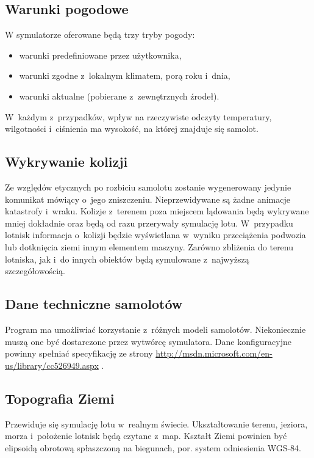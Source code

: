 \documentclass{mwrep}
\begin{document}
\subsection{Warunki pogodowe}
W symulatorze oferowane będą trzy tryby pogody:

\begin{itemize}
\item warunki predefiniowane przez użytkownika,
\item warunki zgodne z~lokalnym klimatem, porą roku i~dnia,
\item warunki aktualne (pobierane z~zewnętrznych źrodeł).
\end{itemize}

W~każdym z~przypadków, wpływ na rzeczywiste odczyty temperatury, wilgotności i~ciśnienia ma wysokość, na której znajduje się samolot.


\subsection{Wykrywanie kolizji}
Ze względów etycznych po rozbiciu samolotu zostanie wygenerowany jedynie komunikat mówiący o~jego zniszczeniu. Nieprzewidywane są żadne animacje katastrofy i~wraku. Kolizje z~terenem poza miejscem lądowania będą wykrywane mniej dokładnie oraz będą od razu przerywały symulację lotu. W~przypadku lotnisk informacja o~kolizji będzie wyświetlana w~wyniku przeciążenia podwozia lub dotknięcia ziemi innym elementem maszyny. Zarówno zbliżenia do terenu lotniska, jak i~do innych obiektów będą symulowane z~najwyższą szczegółowością.

\subsection{Dane techniczne samolotów}
Program ma umożliwiać korzystanie z~różnych modeli samolotów. Niekoniecznie muszą one być dostarczone przez wytwórcę symulatora. Dane konfiguracyjne powinny spełniać specyfikację ze strony \url{http://msdn.microsoft.com/en-us/library/cc526949.aspx} .

\subsection{Topografia Ziemi}
Przewiduje się symulację lotu w~realnym świecie. Ukształtowanie terenu, jeziora, morza i~położenie lotnisk będą czytane z~map. Kształt Ziemi powinien być elipsoidą obrotową spłaszczoną na biegunach, por. system odniesienia WGS-84.
\end{document}
